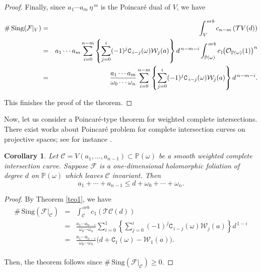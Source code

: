 \documentclass[11pt]{amsart}
\theoremstyle{plain}
\newtheorem{cor}{Corollary}[section]
\theoremstyle{definition}
\begin{document}
\begin{proof}
\vskip 0.2cm
\noindent Finally, since $a_1\cdots a_m\,\eta^{\,m}$ is the Poincar\'e dual of $V$, we have

\begin{eqnarray*}
\#\,\mathrm{Sing}(\mathcal{F}|_V)&=&\int^{\,orb}_Vc_{n-m}\left(\mathcal{T}V(d)\right) \\
&=& a_1\cdots a_m\sum_{i=0}^{n-m}
\left\{\sum_{j=0}^i(-1)^j\texttt{C}_{\,i-j}(\omega)\mathcal{W}_j(a)\right\}d^{\,n-m-i}\int^{\,orb}_{\mathbb{P}(\omega)}
c_1\hspace{-1mm}\left(\mathcal{O}_{\mathbb{P}(\omega)}(1)\right)^n \\
&=& \frac{a_1\cdots a_m}{\omega_0\cdots\omega_n}\sum_{i=0}^{n-m}
\left\{\sum_{j=0}^i(-1)^j\texttt{C}_{\,i-j}(\omega)\mathcal{W}_j(a)\right\}d^{\,n-m-i}.
\end{eqnarray*}

\vskip 0.2cm
\noindent This finishes the proof of the theorem.
\end{proof}

Now, let us consider a Poincar\'e-type theorem for weighted complete intersections.
There exist works about Poincar\'e problem for complete intersection curves on projective spaces;
see for instance \cite{CCG,CJ,CE,Es,Mar}.

\begin{cor} \label{cccor}
Let $\mathcal{C}=V(a_1,\ldots,a_{n-1})\subset\mathbb{P}(\omega)$ be a smooth weighted complete intersection curve.
Suppose $\mathcal{F}$ is a one-dimensional holomorphic foliation of degree $d$ on $\mathbb{P}(\omega)$ 
which leaves $\mathcal{C}$ invariant. Then 
$$a_1+\cdots+a_{n-1}\leq d+\omega_0+\cdots+\omega_n.$$
\end{cor}

\begin{proof} By Theorem \ref{teo1}, we have 
\begin{eqnarray*}
\#\,\mathrm{Sing}(\mathcal{F}|_{\mathcal{C}})&=&\int^{\,orb}_{\mathcal{C}}c_1\left(\mathcal{T}\mathcal{C}(d)\right)\\
&=&\frac{a_1\cdots a_{n-1}}{\omega_0\cdots\omega_n}\sum_{i=0}^{1}
\left\{\sum_{j=0}^i(-1)^j\texttt{C}_{\,i-j}(\omega)\mathcal{W}_j(a)\right\}d^{\,1-i}\\
&=&\frac{a_1\cdots a_{n-1}}{\omega_0\cdots\omega_n}\big(d+\texttt{C}_1(\omega)-\mathcal{W}_1(a)\big).
\end{eqnarray*}
\\
\noindent Then, the theorem follows since $\#\,\mathrm{Sing}(\mathcal{F}|_{\mathcal{C}})\geq0$.
\end{proof}
\end{document}
